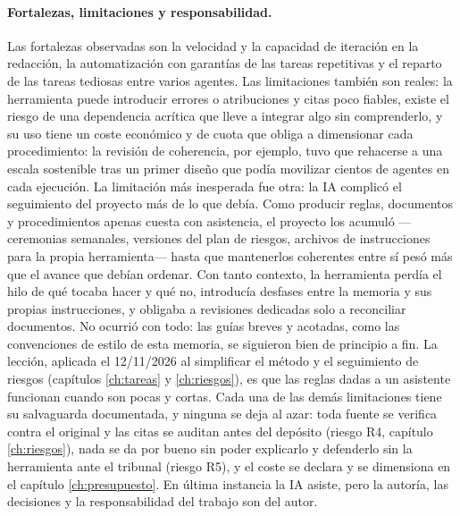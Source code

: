 \paragraph{Fortalezas, limitaciones y responsabilidad.}
Las fortalezas observadas son la velocidad y la capacidad de iteración en la redacción, la automatización con garantías de las tareas repetitivas y el reparto de las tareas tediosas entre varios agentes.
Las limitaciones también son reales: la herramienta puede introducir errores o atribuciones y citas poco fiables, existe el riesgo de una dependencia acrítica que lleve a integrar algo sin comprenderlo, y su uso tiene un coste económico y de cuota que obliga a dimensionar cada procedimiento: la revisión de coherencia, por ejemplo, tuvo que rehacerse a una escala sostenible tras un primer diseño que podía movilizar cientos de agentes en cada ejecución.
La limitación más inesperada fue otra: la \ac{IA} complicó el seguimiento del proyecto más de lo que debía.
Como producir reglas, documentos y procedimientos apenas cuesta con asistencia, el proyecto los acumuló —ceremonias semanales, versiones del plan de riesgos, archivos de instrucciones para la propia herramienta— hasta que mantenerlos coherentes entre sí pesó más que el avance que debían ordenar.
Con tanto contexto, la herramienta perdía el hilo de qué tocaba hacer y qué no, introducía desfases entre la memoria y sus propias instrucciones, y obligaba a revisiones dedicadas solo a reconciliar documentos.
No ocurrió con todo: las guías breves y acotadas, como las convenciones de estilo de esta memoria, se siguieron bien de principio a fin.
La lección, aplicada el 12/11/2026 al simplificar el método y el seguimiento de riesgos (capítulos \ref{ch:tareas} y \ref{ch:riesgos}), es que las reglas dadas a un asistente funcionan cuando son pocas y cortas.
Cada una de las demás limitaciones tiene su salvaguarda documentada, y ninguna se deja al azar: toda fuente se verifica contra el original y las citas se auditan antes del depósito (riesgo R4, capítulo \ref{ch:riesgos}), nada se da por bueno sin poder explicarlo y defenderlo sin la herramienta ante el tribunal (riesgo R5), y el coste se declara y se dimensiona en el capítulo \ref{ch:presupuesto}.
En última instancia la \ac{IA} asiste, pero la autoría, las decisiones y la responsabilidad del trabajo son del autor.

